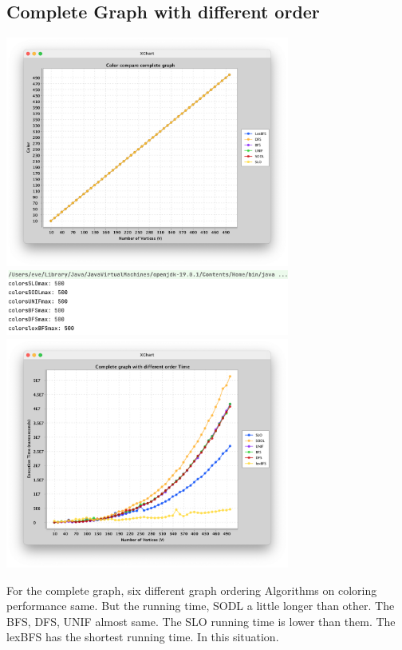 \documentclass{article}
\begin{document}
\subsection{Complete Graph with different order}
    \begin{center}
            \includegraphics[width=0.7\textwidth]{2_1.png}
            \includegraphics[width=0.7\textwidth]{2_2.png}
            \includegraphics[width=0.7\textwidth]{2t1.png}
    \end{center}
                For the complete graph, six different graph ordering Algorithms on coloring performance same. But the running time, SODL a little longer than other. The BFS, DFS, UNIF almost same. The SLO running time is lower than them. The lexBFS has the shortest running time. In this situation. 
\end{document}
